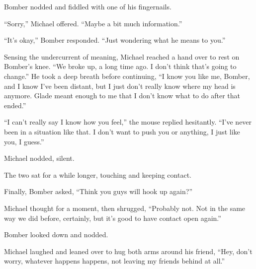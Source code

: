 Bomber nodded and fiddled with one of his fingernails.

``Sorry,'' Michael offered.  ``Maybe a bit much information.''

``It's okay,'' Bomber responded.  ``Just wondering what he means to you.''

Sensing the undercurrent of meaning, Michael reached a hand over to rest on Bomber's knee.  ``We broke up, a long time ago. I don't think that's going to change.''  He took a deep breath before continuing, ``I know you like me, Bomber, and I know I've been distant, but I just don't really know where my head is anymore.  Glade meant enough to me that I don't know what to do after that ended.''

``I can't really say I know how you feel,'' the mouse replied hesitantly.  ``I've never been in a situation like that.  I don't want to push you or anything, I just like you, I guess.''

Michael nodded, silent.

The two sat for a while longer, touching and keeping contact.

Finally, Bomber asked, ``Think you guys will hook up again?''

Michael thought for a moment, then shrugged, ``Probably not.  Not in the same way we did before, certainly, but it's good to have contact open again.''

Bomber looked down and nodded.

Michael laughed and leaned over to hug both arms around his friend, ``Hey, don't worry, whatever happens happens, not leaving my friends behind at all.''
